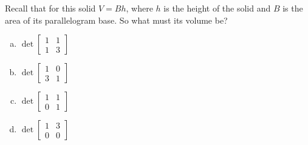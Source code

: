 \begin{activity}{5}
\begin{center}
  \end{center}
  Recall that for this solid \(V=Bh\), where \(h\) is the height of the solid 
  and \(B\) is the area of its parallelogram base.
  So what must its volume be?
\begin{multicols}{4}
\begin{enumerate}[(a)]
\item \(\det \begin{bmatrix} 1 & 1 \\ 1 & 3 \end{bmatrix}\)
\item \(\det \begin{bmatrix} 1 & 0 \\ 3 & 1 \end{bmatrix}\)
\item \(\det \begin{bmatrix} 1 & 1 \\ 0 & 1 \end{bmatrix}\)
\item \(\det \begin{bmatrix} 1 & 3 \\ 0 & 0 \end{bmatrix}\)
\end{enumerate}
\end{multicols}
\end{activity}

